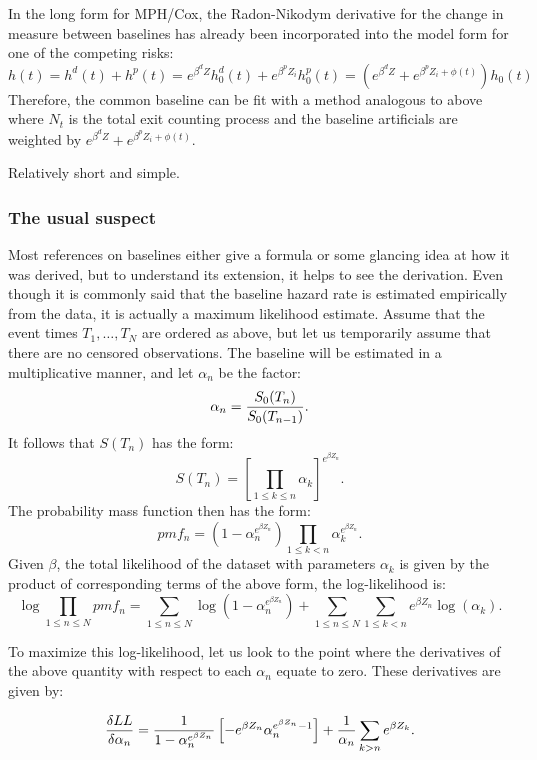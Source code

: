 \documentclass[10pt]{article}
\begin{document}
In the long form for MPH/Cox, the Radon-Nikodym derivative for the change in measure between baselines has already been incorporated
into the model form for one of the competing risks:
$$ h(t) = h^d(t) + h^p(t) = e^{\beta^d Z}h^d_0(t) + e^{\beta^p Z_i}h^p_0(t) = ( e^{\beta^d Z} + e^{\beta^p Z_i + \phi(t)} ) h_0(t) $$
Therefore, the common baseline can be fit with a method analogous to above where $N_t$ is the total exit counting process and the 
baseline artificials are weighted by $e^{\beta^d Z} + e^{\beta^p Z_i + \phi(t)}$.

Relatively short and simple.


\subsubsection{The usual suspect}

Most references on baselines either give a formula or some glancing idea at how it was derived, but to understand its extension, it helps to see the 
derivation. Even though it is commonly said that the baseline hazard rate is estimated empirically from the data, it is actually 
a maximum likelihood estimate.
Assume that the event times $T_1, \ldots, T_N$ are ordered as above, 
but let us temporarily assume that there are no censored observations.  The baseline will be 
estimated in a multiplicative manner, and let $\alpha_n$ be the factor:
	$$\alpha_n={S_0(T_n)\over S_0(T_{n-1})}.$$
It follows that $S(T_n)$ has the form:
	$$S(T_n)={\left[{\prod_{1 \le k \le n} \alpha_k }\right]}^{e^{\beta Z_n}}.$$
The probability mass function then has the form:
	$$pmf_n=(1-\alpha_n^{e^{\beta Z_n}})\prod_{1 \le k < n} \alpha_k^{e^{\beta Z_n}}.$$
Given $\beta$, the total likelihood of the dataset with parameters $\alpha_k$ is given by the product of corresponding terms of the above form, the log-likelihood is:
	$$\log{\prod_{1 \le n \le N} pmf_n}=\sum_{1 \le n \le N} \log(1-\alpha_n^{e^{\beta Z_n}}) +
	\sum_{1 \le n \le N}\sum_{1 \le k < n} e^{\beta Z_n}\log( \alpha_k ).$$

To maximize this log-likelihood, let us look to the point where the derivatives of the above quantity with respect to each $\alpha_n$ equate to zero.  
These derivatives are given by:

$${\delta LL \over \delta \alpha_n}= {1\over 1-\alpha_n^{e^{\beta Z_n}}}\left[{-e^{\beta Z_n}\alpha_n^{e^{\beta Z_n}-1}}\right] +{1\over \alpha_n}
\sum_{k > n} e^{\beta Z_k}.$$
\end{document}
